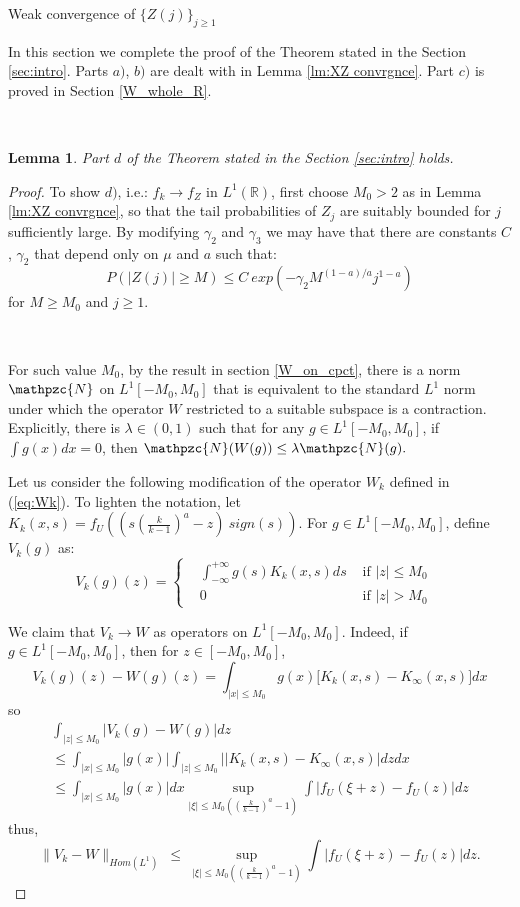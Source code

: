 \documentclass[12pt]{article}
\newtheorem{lemma}[theorem]{Lemma}
\begin{document}
\begin{section}{Weak convergence of $\{Z(j)\}_{j \ge 1}$ }

In this section we complete the proof of the Theorem stated in the Section \ref{sec:intro}. Parts $a)$, $b)$ are dealt with in Lemma \ref{lm:XZ convrgnce}. Part $c)$ is proved in Section \ref{W_whole_R}.  

\  

\begin{lemma}
	Part $d$ of the Theorem stated in the Section \ref{sec:intro} holds.
\end{lemma}

\begin{proof} To show $d)$, i.e.: $ f_k  \rightarrow f_Z$ in $L^1(\mathbb{R})$, first choose $M_0 > 2$ as in Lemma \ref{lm:XZ convrgnce}, so that the tail probabilities of $Z_j$ are suitably bounded for $j$ sufficiently large. By modifying $\gamma_2$ and $\gamma_3$ we may have that there are constants $C$, $\gamma_2$ that depend only on $\mu$ and $a$ such that:
$$
P( |Z(j)| \ge M) \le C\ exp( - \gamma_2 M^{(1-a)/a} j^{1-a} )
$$
for $M \ge M_0$ and $j \ge 1$.  

\  

For such value $M_0$, by the result in section \ref{W_on_cpct}, there is a norm $\mathpzc{N}$ on $L^1[-M_0,M_0]$ that is equivalent to the standard $L^1$ norm under which the operator $W$ restricted to a suitable subspace is a contraction. Explicitly, there is $\lambda \in (0,1)$ such that for any $g \in L^1[-M_0,M_0]$, if $\int g(x)dx = 0$, then $\mathpzc{N}(W(g)) \le \lambda \mathpzc{N}(g).$   	
	   
Let us consider the following modification of the operator $W_k$ defined in (\ref{eq:Wk}). To lighten the notation, let $K_k(x,s)= f_U\!\left(  \left(s \left(\frac{k}{k-1}\right)^a - z \right)\ sign(s) \right)$. For $g \in L^1[-M_0,M_0]$, define $V_k(g)$ as:
$$
V_k(g)(z) = \left\{ 
\begin{aligned}
& \int_{-\infty}^{+\infty} g(s) K_k(x,s) ds  &\text{ if }|z| \le M_0  &\\
& 0 &\text{ if }|z| > M_0  &
\end{aligned}
\right.
$$

We claim that $V_k \rightarrow W$ as operators on $L^1[-M_0,M_0]$. Indeed, if $g \in L^1[-M_0,M_0]$, then for $z \in [-M_0,M_0]$,
$$
V_k(g)(z) - W(g)(z) = \int_{|x| \le M_0} g(x) \big[ K_k(x,s) - K_{\infty}(x,s)] dx
$$
so
\begin{align*}
&\int_{|z| \le M_0} |V_k(g) - W(g)| dz  &\\
&\le \int_{|x| \le M_0} |g(x)| 
\int_{|z| \le M_0} \big| \big| K_k(x,s) - K_{\infty}(x,s)\big| dz dx &\\
&\le  
\int_{|x| \le M_0} |g(x)| dx
\sup_{|\xi| \le M_0 ((\frac{k}{k-1})^a -1)} \int \big| f_U\!(\xi + z ) -
f_U\!( z )| dz &
\end{align*}
thus,
$$
\| V_k - W\|_{Hom(L^1)} ~\le~ \sup_{|\xi| \le M_0 ((\frac{k}{k-1})^a -1)} \int \big| f_U\!(\xi + z ) -
f_U\!( z )| dz .
$$


\end{proof}
\end{section}
\end{document}
